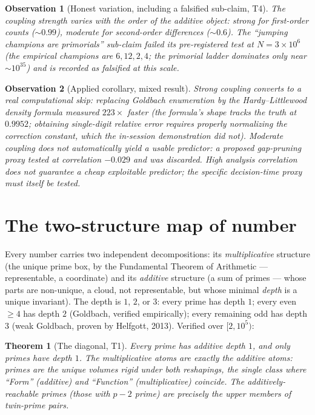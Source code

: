 \documentclass[11pt]{article}
\newtheorem{theorem}{Theorem}
\newtheorem{observation}{Observation}
\begin{document}
\begin{observation}[Honest variation, including a falsified sub-claim, T4]
The coupling strength varies with the order of the additive object: strong for first-order counts
($\sim\!0.99$), moderate for second-order differences ($\sim\!0.6$). The ``jumping champions are primorials''
sub-claim \emph{failed} its pre-registered test at $N=3\times10^6$ (the empirical champions are $6,12,2,4$;
the primorial ladder dominates only near $\sim\!10^{35}$) and is recorded as falsified at this scale.
\end{observation}

\begin{observation}[Applied corollary, mixed result]
Strong coupling converts to a real computational skip: replacing Goldbach enumeration by the
Hardy--Littlewood density formula measured $223\times$ faster (the formula's shape tracks the truth at
$0.9952$; obtaining single-digit relative error requires properly normalizing the correction constant,
which the in-session demonstration did not). Moderate coupling does \emph{not} automatically yield a usable
predictor: a proposed gap-pruning proxy tested at correlation $-0.029$ and was discarded. High analysis
correlation does not guarantee a cheap exploitable predictor; the specific decision-time proxy must itself
be tested.
\end{observation}

\section{The two-structure map of number}

Every number carries two independent decompositions: its \emph{multiplicative} structure (the unique
prime box, by the Fundamental Theorem of Arithmetic --- representable, a coordinate) and its
\emph{additive} structure (a sum of primes --- whose parts are non-unique, a cloud, not representable, but
whose minimal \emph{depth} is a unique invariant). The depth is $1$, $2$, or $3$: every prime has depth $1$;
every even $\ge 4$ has depth $2$ (Goldbach, verified empirically); every remaining odd has depth $3$ (weak
Goldbach, proven by Helfgott, 2013). Verified over $[2,10^5)$:

\begin{theorem}[The diagonal, T1]
Every prime has additive depth $1$, and only primes have depth $1$. The multiplicative atoms are exactly
the additive atoms: primes are the unique volumes rigid under both reshapings, the single class where
``Form'' (additive) and ``Function'' (multiplicative) coincide. The additively-reachable primes
(those with $p-2$ prime) are precisely the upper members of twin-prime pairs.
\end{theorem}
\end{document}
